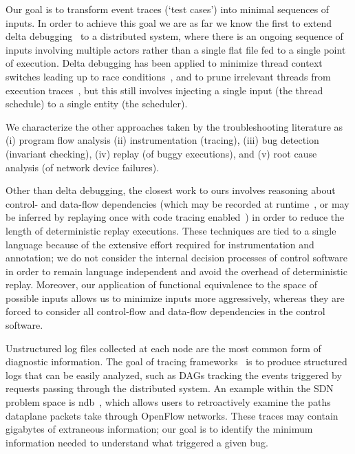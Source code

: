 Our goal is to transform
event traces (`test cases') into minimal sequences of inputs.
In order to achieve this goal we are as far we know the first to
extend delta debugging~\cite{Zeller:1999:YMP:318773.318946,Zeller:2002:SIF:506201.506206}
to a distributed system, where there is an ongoing sequence of inputs
involving multiple actors rather than a single flat file fed to a single point of
execution. Delta debugging has been applied to minimize thread context switches
leading up to race conditions~\cite{choi2002isolating}, and to
prune irrelevant threads from execution traces~\cite{huang2012lean}, but this still
involves injecting a single input (the thread schedule) to a single entity (the
scheduler).

We characterize the other approaches taken by the troubleshooting literature
as (i) program flow analysis (ii) instrumentation (tracing),
(iii) bug detection (invariant checking),
(iv) replay (of buggy executions), and
(v) root cause analysis (of network device failures).

\vspace{0.05in}
 Other than delta debugging,
the closest work to ours involves reasoning about
control- and data-flow dependencies
(which may be recorded at runtime~\cite{Lee:2011:TGR:1993498.1993528}, or
may be inferred by replaying once with code tracing enabled~\cite{tallam2007enabling})
in order to reduce the length of deterministic replay executions. These
techniques are tied to a single language because of the extensive effort
required for instrumentation and annotation; we do not consider the internal
decision processes of control software in order to remain language
independent and avoid the overhead of deterministic replay. %
Moreover, our application of functional equivalence to the space of
possible inputs allows us to minimize
inputs more aggressively, whereas they are forced to consider all control-flow
and data-flow dependencies in the control software.

\vspace{0.05in}
 Unstructured
log files collected at each node are the most common form of diagnostic information. The goal of
tracing frameworks~\cite{pip,fonseca2007x,Chen02pinpoint:problem,ndb14,barham2004using}
is to produce structured logs that can be easily analyzed, such as DAGs tracking the events triggered by
requests passing through the distributed system. An example within the SDN
problem space is ndb~\cite{ndb14}, which
allows users to retroactively examine the paths dataplane packets
take through OpenFlow networks. These traces may contain gigabytes of
extraneous information; our goal is to identify the minimum information needed
to understand what triggered a given bug.

